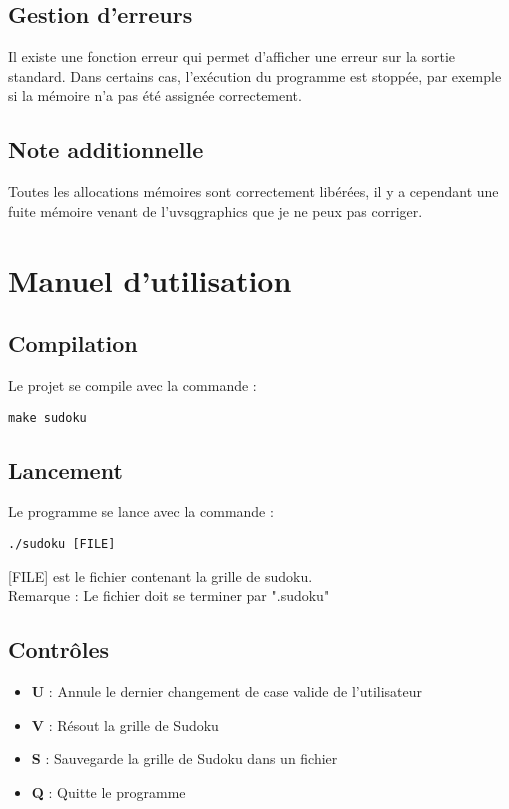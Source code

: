 \documentclass{article}
\begin{document}
\subsection{Gestion d'erreurs}
Il existe une fonction erreur qui permet d'afficher une erreur sur la sortie standard. Dans certains cas, l'exécution du programme est stoppée, par exemple si la mémoire n'a pas été assignée correctement.

\subsection{Note additionnelle}
Toutes les allocations mémoires sont correctement libérées, il y a cependant une fuite mémoire venant de l'uvsqgraphics que je ne peux pas corriger.

\newpage
\section{Manuel d'utilisation}

\subsection{Compilation}
Le projet se compile avec la commande :
\begin{verbatim}
make sudoku
\end{verbatim}

\subsection{Lancement}
Le programme se lance avec la commande :
\begin{verbatim}
./sudoku [FILE]
\end{verbatim}
[FILE] est le fichier contenant la grille de sudoku. \\
Remarque : Le fichier doit se terminer par ".sudoku"

\subsection{Contrôles}
\begin{itemize}
\item \textbf{U} : Annule le dernier changement de case valide de l'utilisateur
\item \textbf{V} : Résout la grille de Sudoku
\item \textbf{S} : Sauvegarde la grille de Sudoku dans un fichier
\item \textbf{Q} : Quitte le programme
\end{itemize}
\end{document}
